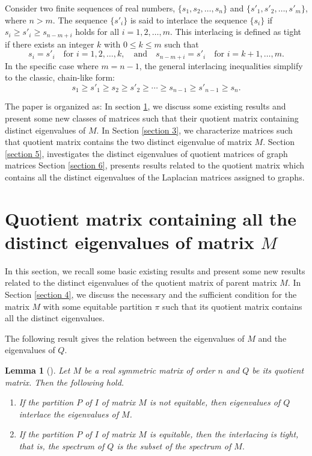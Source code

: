 \documentclass[12pt,twoside]{article}
\newtheorem{lemma}[theorem]{Lemma}
\begin{document}
Consider two finite sequences of real numbers, $\{s_1, s_2, \dots, s_n\}$ and $\{s'_1, s'_2, \dots, s'_m\}$, where $n > m$. The sequence $\{s'_i\}$ is said to interlace the sequence $\{s_i\}$ if $s_i \geq s'_i \geq s_{n-m+i}$
holds for all $i = 1, 2, \dots, m$. This interlacing is defined as tight if there exists an integer $k$ with $0 \leq k \leq m$ such that
$$
s_i = s'_i \quad \text{for } i = 1, 2, \dots, k, \quad \text{and} \quad s_{n-m+i} = s'_i \quad \text{for } i = k+1, \dots, m.
$$
In the specific case where $m = n-1$, the general interlacing inequalities simplify to the classic, chain-like form:
$$
s_1 \geq s'_1 \geq s_2 \geq s'_2 \geq \cdots \geq s_{n-1} \geq s'_{n-1} \geq s_n.
$$

The paper is organized as: In section \ref{section 2}, we discuss some existing results and present some new classes of matrices such that their quotient matrix containing distinct eigenvalues of $M.$ In Section \ref{section 3}, we characterize matrices such that quotient matrix contains the two distinct eigenvalue of matrix $M.$ Section \ref{section 5}, investigates the distinct eigenvalues of quotient matrices of graph matrices Section \ref{section 6}, presents results related to the quotient matrix which contains all the distinct eigenvalues of the Laplacian matrices assigned to graphs.

\section{Quotient matrix containing all the distinct eigenvalues of matrix $M$}\label{section 2}
In this section, we recall some basic existing results and present some new results related to the distinct eigenvalues of the quotient matrix of parent matrix $M.$ In Section \ref{section 4}, we discuss the necessary and the sufficient condition for the matrix $M$ with some equitable partition $\pi$ such that its quotient matrix contains all the distinct eigenvalues. 

The following result gives the relation between the eigenvalues of $ M $ and the eigenvalues of $ Q. $
\begin{lemma}[\cite{heamers}]\label{quotient matrix eigenvalues}
	Let $ M $ be a real symmetric matrix of order $ n $ and $ Q $ be its quotient matrix. Then the following hold.
	\begin{enumerate}
		\item If the partition $ P $ of $ I$ of matrix $ M $ is not equitable, then eigenvalues of $ Q $ interlace the eigenvalues of $ M $.
		\item If the partition $ P $ of $ I $ of matrix $ M $ is equitable, then the interlacing is tight, that is, the spectrum of $ Q $ is the subset of the spectrum of $ M. $
	\end{enumerate}
\end{lemma}
\end{document}
